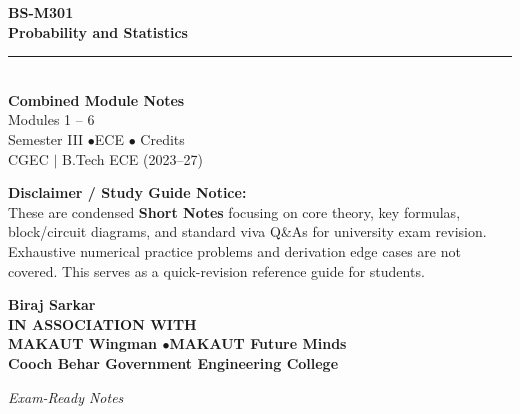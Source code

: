 \documentclass[12pt,a4paper]{article}
\begin{document}
\thispagestyle{empty}


\vspace*{1.0cm}
\begin{center}
  {\Huge\bfseries\color{myred} BS-M301}\\[10pt]
  {\LARGE\bfseries\color{mydark} Probability and Statistics}\\[20pt]
  {\color{myred}\rule{0.7\linewidth}{1.5pt}}\\[18pt]
  {\Large\color{myteal}\textbf{Combined Module Notes}}\\[8pt]
  {\large\color{mydark} Modules 1 -- 6}\\[40pt]
  {\normalsize\color{mydark} Semester III \quad$\bullet$\quad ECE \quad$\bullet$ Credits}\\[12pt]
  {\normalsize\color{mydark} CGEC \;$|$\; B.Tech ECE (2023--27)}
\end{center}
\vspace{1.0cm}
\begin{center}
  \begin{tcolorbox}[colback=mygray, colframe=mgframe, boxrule=0.5pt, arc=3pt, width=0.85\linewidth]
    \centering\small\color{mydark}
    \textbf{Disclaimer / Study Guide Notice:}\\
    These are condensed \textbf{Short Notes} focusing on core theory, key formulas, block/circuit diagrams, and standard viva Q\&As for university exam revision. Exhaustive numerical practice problems and derivation edge cases are not covered. This serves as a quick-revision reference guide for students.
  \end{tcolorbox}
\end{center}
\vfill
\vspace{0.6cm}
\begin{center}
  {\large\bfseries\color{mypurple} Biraj Sarkar}\\[16pt]
  {\footnotesize\color{watermark}\textbf{IN ASSOCIATION WITH}}\\[8pt]
  {\small\bfseries\color{mydark} MAKAUT Wingman \quad$\bullet$\quad MAKAUT Future Minds}\\[12pt]
  {\large\bfseries\color{myteal} Cooch Behar Government Engineering College}
\end{center}
\vfill
\begin{center}{\small\color{watermark}\textit{Exam-Ready Notes}}\end{center}
\clearpage
\end{document}
